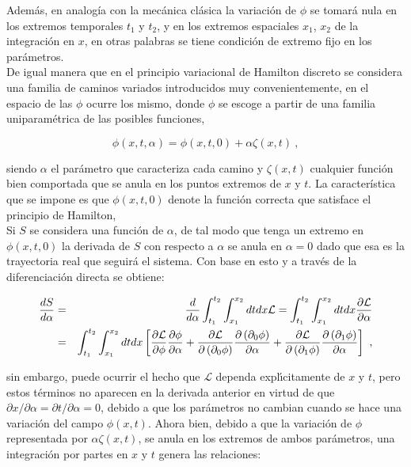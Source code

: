 \noindent
Además, en analogía con la mecánica clásica la variaci\'{o}n de $\phi$ se tomará nula en los extremos temporales $t_{1}$ y $t_{2}$, y en los extremos espaciales $x_{1}$, $x_{2}$ de la integraci\'{o}n en $x$, en otras palabras se tiene condici\'{o}n de extremo fijo en los par\'{a}metros.\\

\noindent
De igual manera que en el principio variacional de Hamilton discreto se considera una familia de caminos variados introducidos muy convenientemente, en el espacio de las $\phi$ ocurre los mismo, donde $\phi$ se escoge a partir de una familia uniparam\'{e}trica de las posibles funciones,

\begin{equation*}
\phi \left( x,t,\alpha \right) =\phi \left( x,t,0\right) +\alpha \zeta \left( x,t\right)~,
\end{equation*}

\noindent
siendo $\alpha$ el parámetro que caracteriza cada camino y $\zeta \left(x,t\right)$ cualquier funci\'{o}n bien comportada que se anula en los puntos extremos de $x$ y $t$. La característica que se impone es que $\phi (x,t,0)$ denote la funci\'{o}n correcta que satisface el principio de Hamilton,\\

\noindent
Si $S$ se considera una funci\'{o}n de $\alpha$, de tal modo que tenga un extremo en $\phi (x,t,0)$ la derivada de $S$ con respecto a $\alpha $ se anula en $\alpha =0$ dado que esa es la trayectoria real que seguir\'{a} el sistema. Con base en esto y a trav\'{e}s de la diferenciaci\'{o}n directa se obtiene:

\begin{eqnarray}
\frac{dS}{d\alpha } &=&\frac{d}{d\alpha }\int_{t_{1}}^{t_{2}}\int_{x_{1}}^{x_{2}}dtdx\mathcal{L}=\int_{t_{1}}^{t_{2}}\int_{x_{1}}^{x_{2}}dtdx\frac{\partial \mathcal{L}}{\partial \alpha } \notag \\
&=&\int_{t_{1}}^{t_{2}}\int_{x_{1}}^{x_{2}}dtdx\left[ \frac{\partial \mathcal{L}}{\partial \phi }\frac{\partial \phi }{\partial \alpha }+\frac{\partial \mathcal{L}}{\partial \left( \partial _{0}\phi \right) }\frac{\partial \left( \partial _{0}\phi \right) }{\partial \alpha }+\frac{\partial \mathcal{L}}{\partial \left( \partial _{1}\phi \right) }\frac{\partial \left( \partial _{1}\phi \right) }{\partial \alpha }\right] ~,
\label{2.17p}
\end{eqnarray}

\noindent
sin embargo, puede ocurrir el hecho que $\mathcal{L}$ dependa expl\'{\i}citamente de $x$ y $t$, pero estos t\'{e}rminos no aparecen en la derivada anterior en virtud de que $\partial x/\partial \alpha =\partial t/\partial \alpha =0$, debido a que los par\'{a}metros no cambian cuando se hace una variaci\'{o}n del campo $\phi (x,t)$. Ahora bien, debido a que la variaci\'{o}n de $\phi$ representada por $\alpha \zeta \left( x,t\right) $, se anula en los extremos de ambos par\'{a}metros, una integraci\'{o}n por partes en $x$
y $t$ genera las relaciones:

